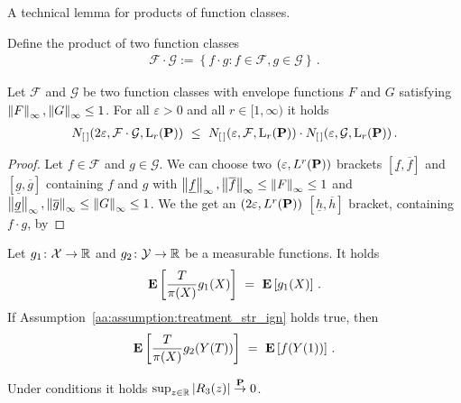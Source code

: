 A technical lemma for products of function classes.

Define the product of two function classes
\begin{gather*}
  \mathcal{F}\cdot \mathcal{G}
  :=
  \left\{ 
    f\cdot g
    \colon
    f\in\mathcal{F},
    g\in\mathcal{G}
  \right\}\,.
\end{gather*}
\begin{lemma}
  \label{lem_prod_br}
  Let
  $\mathcal{F}$ and $\mathcal{G}$ be two function classes 
  with envelope functions $F$ and $G$ satisfying
  $\norm{F}_\infty,\norm{G}_\infty\le 1$.
  For all $\varepsilon>0$ and all $r\in [1,\infty)$ it holds
  \begin{gather*}
    N_{[\,]}(2\varepsilon,\mathcal{F}\cdot\mathcal{G},\mathrm{L}_r(\P))
    \
    \le
    \ 
    N_{[\,]}(\varepsilon,\mathcal{F},\mathrm{L}_r(\P))
    \cdot
    N_{[\,]}(\varepsilon,\mathcal{G},\mathrm{L}_r(\P))
    \,.
  \end{gather*}
\end{lemma}
\begin{proof}
  Let $f\in\mathcal{F}$ and $g\in\mathcal{G}$.
  We can choose two 
  $(\varepsilon,L^r(\P))$
  brackets
  $[\underline{f},\overline{f}]$
  and
  $[\underline{g},\overline{g}]$
  containing $f$ and $g$ with 
  $\norm{\underline{f}}_\infty,\norm{\overline{f}}_\infty\le\norm{F}_\infty\le 1$
  and
  $\norm{\underline{g}}_\infty,\norm{\overline{g}}_\infty\le\norm{G}_\infty\le 1$.
  We the get an 
  $(2\varepsilon,L^r(\P))$
  $[\underline{h},\overline{h}]$
  bracket, containing $f\cdot g$, by
\end{proof}
\begin{lemma}
  \label{ps_weights_lemma}
  Let
  $
  g_1\colon
  \mathcal{X}\to\R
  $
  and
  $
  g_2\colon
  \mathcal{Y}\to\R
  $
  be a measurable functions.
  It holds
  \begin{gather*}
    \E
    \left[
    \frac{T}{\pi(X)}
    g_1(X)
    \right]
    \ 
    =
    \ 
    \E
    \left[
    g_1(X)
    \right]
    \,.
  \end{gather*}
  If Assumption~\ref{aa:assumption:treatment_str_ign} holds true, then
  \begin{gather*}
    \E
    \left[
    \frac{T}{\pi(X)}
    g_2(Y(T))
    \right]
    \ 
    =
    \ 
    \E
    \left[
    f(Y(1))
    \right]
    \,.
  \end{gather*}
\end{lemma}
\begin{lemma}
  Under conditions it holds
  $\sup_{z\in\R}\left| R_3(z) \right|\overset{\P}{\to}0$.
\end{lemma}
